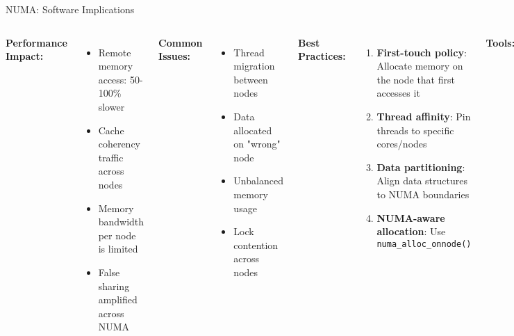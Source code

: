 \documentclass[aspectratio=169,12pt]{beamer}
\begin{document}
\begin{frame}{NUMA: Software Implications}
\begin{columns}[T]
\textbf{Performance Impact:}
\begin{itemize}
\item Remote memory access: 50-100\% slower
\item Cache coherency traffic across nodes
\item Memory bandwidth per node is limited
\item False sharing amplified across NUMA
\end{itemize}

\vspace{0.3cm}
\textbf{Common Issues:}
\begin{itemize}
\item Thread migration between nodes
\item Data allocated on "wrong" node
\item Unbalanced memory usage
\item Lock contention across nodes
\end{itemize}

\textbf{Best Practices:}
\begin{enumerate}
\item \textbf{First-touch policy}: Allocate memory on the node that first accesses it
\item \textbf{Thread affinity}: Pin threads to specific cores/nodes
\item \textbf{Data partitioning}: Align data structures to NUMA boundaries
\item \textbf{NUMA-aware allocation}: Use \texttt{numa\_alloc\_onnode()}
\end{enumerate}

\vspace{0.3cm}
\textbf{Tools:}
\begin{itemize}
\item \texttt{numactl}: Control NUMA policy
\item \texttt{lstopo}: Visualize topology
\item \texttt{numastat}: Memory statistics
\item \texttt{perf}: Profile NUMA events
\end{itemize}
\end{columns}
\end{frame}
\end{document}
